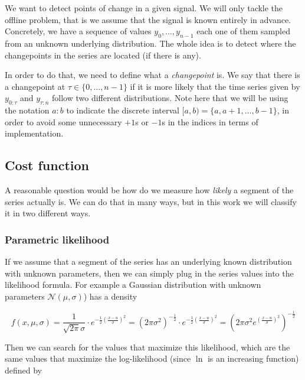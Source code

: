 \documentclass[pdflatex,sn-mathphys]{sn-jnl}%
\theoremstyle{thmstyleone}%
\theoremstyle{thmstyletwo}%
\theoremstyle{thmstylethree}%
\begin{document}
We want to detect points of change in a given signal. We will only tackle the offline problem, that is we assume that the signal is known entirely in advance. Concretely, we have a sequence of values $y_0, \dots, y_{n-1}$ each one of them sampled from an unknown underlying distribution. The whole idea is to detect where the changepoints in the series are located (if there is any).

In order to do that, we need to define what a \textit{changepoint} is. We say that there is a changepoint at $\tau \in \{0, \dots, n-1\}$ if it is more likely that the time series given by $y_{0:\tau}$ and $y_{\tau:n}$ follow two different distributions. Note here that  we will be using the notation $a:b$ to indicate the discrete interval $[a, b) = \{a, a+1, \dots, b-1 \}$, in order to avoid some unnecessary $+1$s or $-1$s in the indices in terms of implementation.

\subsection{Cost function}

A reasonable question would be how do we measure how \textit{likely} a segment of the series actually is. We can do that in many ways, but in this work we will classify it in two different ways. 

\subsubsection{Parametric likelihood}

If we assume that a segment of the series has an underlying known distribution with unknown parameters, then we can simply plug in the series values into the likelihood formula. For example a Gaussian distribution with unknown parameters $\mathcal{N}(\mu, \sigma)$) has a density

\begin{equation*}
    f(x, \mu, \sigma) = \frac{1}{\sqrt{2\pi} \sigma} \cdot e^{-\frac{1}{2} \left ( \frac{x-u}{\sigma} \right )^2} = (2\pi \sigma^2)^{-\frac{1}{2}} \cdot e^{-\frac{1}{2} \left ( \frac{x-u}{\sigma} \right )^2} = \left ( 2\pi \sigma^2 e^{\left ( \frac{x-u}{\sigma} \right )^2} \right )^{-\frac{1}{2}} 
\end{equation*}

Then we can search for the values that maximize this likelihood, which are the same values that maximize the log-likelihood (since $\ln$ is an increasing function) defined by
\end{document}

